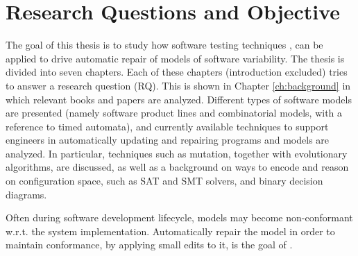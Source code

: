 \section{Research Questions and Objective}\label{sec:rq}
The goal of this thesis is to study how software testing techniques , can be applied to drive automatic repair of models of software variability.
The thesis is divided into seven chapters. Each of these chapters (introduction excluded) tries to answer a research question (RQ).
This is shown in Chapter \ref{ch:background} in which relevant books and papers are analyzed. %
Different types of software models are presented (namely software product lines and combinatorial models, with a reference to timed automata), and currently available techniques to support engineers in automatically updating and repairing programs and models are analyzed. In particular, techniques such as mutation, together with evolutionary algorithms, are discussed, as well as a background on ways to encode and reason on configuration space, such as SAT and SMT solvers, and binary decision diagrams.

Often during software development lifecycle, models may become non-conformant w.r.t. the system implementation.
Automatically repair the model in order to maintain conformance, by applying small edits to it, is the goal of .%

